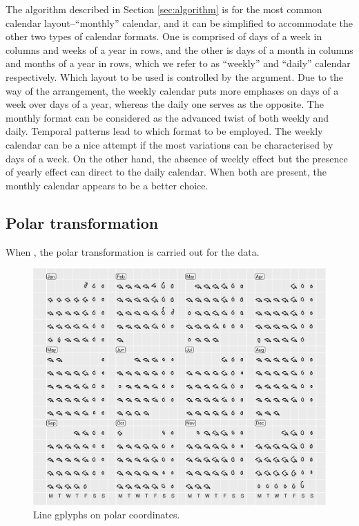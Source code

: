 \documentclass[article]{jss}
\begin{document}
The algorithm described in Section \ref{sec:algorithm} is for the most
common calendar layout--``monthly'' calendar, and it can be simplified
to accommodate the other two types of calendar formats. One is comprised
of days of a week in columns and weeks of a year in rows, and the other
is days of a month in columns and months of a year in rows, which we
refer to as ``weekly'' and ``daily'' calendar respectively. Which layout
to be used is controlled by the  argument. Due to the way
of the arrangement, the weekly calendar puts more emphases on days of a
week over days of a year, whereas the daily one serves as the opposite.
The monthly format can be considered as the advanced twist of both
weekly and daily. Temporal patterns lead to which format to be employed.
The weekly calendar can be a nice attempt if the most variations can be
characterised by days of a week. On the other hand, the absence of
weekly effect but the presence of yearly effect can direct to the daily
calendar. When both are present, the monthly calendar appears to be a
better choice.

\subsection{Polar transformation}\label{polar-transformation}

When , the polar transformation is carried out for
the data.

\begin{CodeChunk}
\begin{figure}

{\centering \includegraphics[width=\textwidth]{figure/flinders-polar-1} 

}

\caption[Line gplyphs on polar coordinates]{Line gplyphs on polar coordinates.}\label{fig:flinders-polar}
\end{figure}
\end{CodeChunk}
\end{document}
